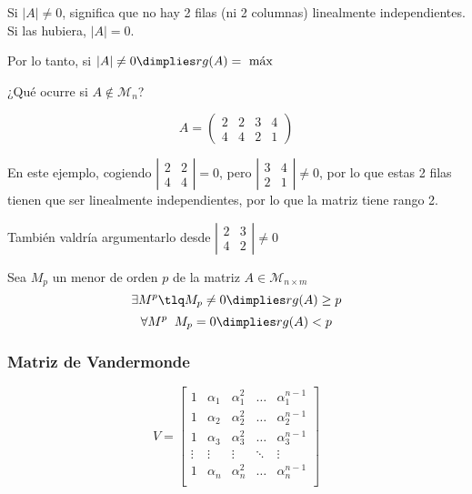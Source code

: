 Si $|A| \neq 0$, significa que no hay 2 filas (ni 2 columnas) linealmente independientes. Si las hubiera, $|A| = 0$.

Por lo tanto, si $|A|\neq 0 \dimplies rg(A) = \text{ máx}$

¿Qué ocurre si $A\not\in\mathcal{M}_n$?

\begin{example}
\[
    A=\begin{pmatrix}2&2&3&4\\4&4&2&1\end{pmatrix}
\]

En este ejemplo, cogiendo $\left|\begin{matrix}2&2\\4&4\end{matrix}\right| = 0$, pero $\left|\begin{matrix}3&4\\2&1\end{matrix}\right| \neq 0$, por lo que estas 2 filas tienen que ser linealmente independientes, por lo que la matriz tiene rango 2.

También valdría argumentarlo desde $\left|\begin{matrix}2&3\\4&2\end{matrix}\right| \neq 0$
\end{example}

\begin{prop}
Sea $M_p$ un menor de orden $p$ de la matriz $A\in\mathcal{M}_{n\times m}$
\[\exists M^p \tlq M_p \neq 0 \dimplies rg(A) \geq p\]
\[\forall M^p \;\; M_p = 0 \dimplies rg(A) < p\]
\end{prop}

\subsubsection{Matriz de Vandermonde}
\[
V=\begin{bmatrix}
1 & \alpha_1 & \alpha_1^2 & \dots & \alpha_1^{n-1}\\
1 & \alpha_2 & \alpha_2^2 & \dots & \alpha_2^{n-1}\\
1 & \alpha_3 & \alpha_3^2 & \dots & \alpha_3^{n-1}\\
\vdots & \vdots & \vdots & \ddots &\vdots \\
1 & \alpha_n & \alpha_n^2 & \dots & \alpha_n^{n-1}\\
\end{bmatrix}\]

